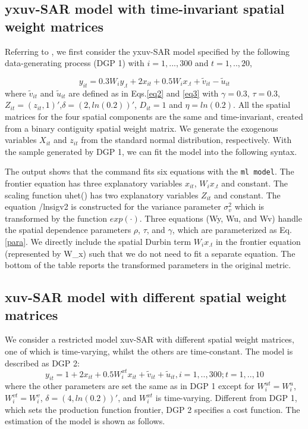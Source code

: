 \subsection{yxuv-SAR model with time-invariant spatial weight matrices}
\vspace{5pt}
Referring to  \cite{galli2022spatial}, we first consider the yxuv-SAR model specified by the following data-generating process (DGP 1) with $i=1,...,300$ and $t=1,..,20$,

\begin{equation}\label{dgp1}
	y_{it} = 0.3W_{i}y_{.t}+2x_{it}+ 0.5W_{i}x_{.t}  + \tilde{v}_{it}-\tilde{u}_{it}
\end{equation}
where $\tilde{v}_{it}$ and $\tilde{u}_{it}$ are defined as in Eqs.\eqref{eq2} and \eqref{eq3} with $\gamma=0.3$, $\tau=0.3$, $Z_{it}=(z_{it},1)'$,$\delta=(2, ln(0.2))'$, $D_{it}=1$ and $\eta = ln(0.2)$. All the spatial matrices for the four spatial components are the same and time-invariant, created from a binary contiguity spatial weight matrix. We generate the exogenous variables $X_{it}$ and $z_{it}$ from the standard normal distribution, respectively. With the sample generated by DGP 1, we can fit the model into the following syntax.

\begin{stlog}
	
\end{stlog}

The output shows that the command fits six equations with the {\tt ml model}. The frontier equation has three explanatory variables $x_{it}$, $W_ix_{.t}$ and constant. The scaling function uhet() has two explanatory variables $Z_{it}$ and constant.  The equation  /lnsigv2 is constructed for the variance parameter  $\sigma_v^2$ which is transformed by the function $exp(\cdot)$. Three equations (Wy, Wu, and Wv) handle the spatial dependence parameters $\rho$, $\tau$, and $\gamma$, which are parameterized as Eq.\eqref{para}. We directly include the spatial Durbin term $W_ix_{.t}$ in the frontier equation  (represented by W\_x) such that we do not need to fit a separate equation.  The bottom of the table reports the transformed parameters in the original metric.

\subsection{xuv-SAR model with different spatial weight matrices}
\vspace{5pt}
We consider a restricted model xuv-SAR with different spatial weight matrices, one of which is time-varying, whilst the others are time-constant.  The model is described as DGP 2:
\begin{equation}\label{dgp2}
	y_{it} = 1+2x_{it}+ 0.5W_{i}^{xt}x_{it} + \tilde{v}_{it}+\tilde{u}_{it}, i=1,..,300; t=1,..,10
\end{equation}
where the other parameters are set the same as in DGP 1 except for $W_{i}^{ut}=W_{i}^u$, $W_{i}^{vt}=W_{i}^v$, $\delta = (4,ln(0.2))'$, and $W_{i}^{xt}$ is time-varying.  Different from DGP 1, which sets the production function frontier, DGP 2 specifies a cost function. The estimation of the model is shown as follows.

